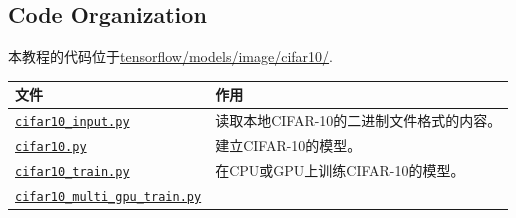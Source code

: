 \subsection {Code Organization}

本教程的代码位于\href{https://tensorflow.googlesource.com/tensorflow/+/master/tensorflow/models/image/cifar10/}{tensorflow/models/image/cifar10/}.



\begin{longtable}[c]{@{}ll@{}}
\toprule
\begin{minipage}[b]{0.05\columnwidth}\raggedright\strut
文件
\strut\end{minipage} &
\begin{minipage}[b]{0.05\columnwidth}\raggedright\strut
作用
\strut\end{minipage}\tabularnewline
\midrule
\endhead
\begin{minipage}[t]{0.05\columnwidth}\raggedright\strut
\href{https://tensorflow.googlesource.com/tensorflow/+/master/tensorflow/models/image/cifar10/cifar10_input.py}{\texttt{cifar10\_input.py}}
\strut\end{minipage} &
\begin{minipage}[t]{0.05\columnwidth}\raggedright\strut
读取本地CIFAR-10的二进制文件格式的内容。
\strut\end{minipage}\tabularnewline
\begin{minipage}[t]{0.05\columnwidth}\raggedright\strut
\href{https://tensorflow.googlesource.com/tensorflow/+/master/tensorflow/models/image/cifar10/cifar10.py}{\texttt{cifar10.py}}
\strut\end{minipage} &
\begin{minipage}[t]{0.05\columnwidth}\raggedright\strut
建立CIFAR-10的模型。
\strut\end{minipage}\tabularnewline
\begin{minipage}[t]{0.05\columnwidth}\raggedright\strut
\href{https://tensorflow.googlesource.com/tensorflow/+/master/tensorflow/models/image/cifar10/cifar10_train.py}{\texttt{cifar10\_train.py}}
\strut\end{minipage} &
\begin{minipage}[t]{0.05\columnwidth}\raggedright\strut
在CPU或GPU上训练CIFAR-10的模型。
\strut\end{minipage}\tabularnewline
\begin{minipage}[t]{0.05\columnwidth}\raggedright\strut
\href{https://tensorflow.googlesource.com/tensorflow/+/master/tensorflow/models/image/cifar10/cifar10_multi_gpu_train.py}{\texttt{cifar10\_multi\_gpu\_train.py}}

\end{minipage}
\end{longtable}
